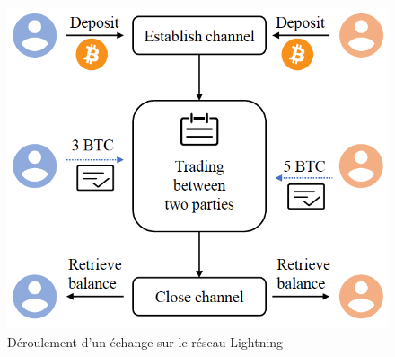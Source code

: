 \begin{figure}[h!]
    \centering
    \includegraphics[scale=0.3]{decentralisation/Procedures-of-Lightning-network.png}
    \caption{Déroulement d'un échange sur le réseau Lightning}
    \label{fig:lightningNetwork}
\end{figure}

